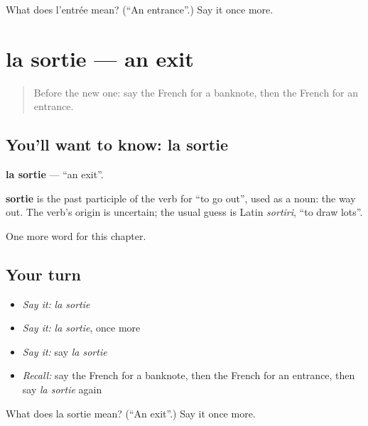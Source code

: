 \begin{tcolorbox}[breakable,colback=teal!4,colframe=teal!35!black,title={Before you move on}]
What does l'entrée mean? (\textquotedblleft{}An entrance\textquotedblright{}.) Say it once more.
\end{tcolorbox}
\section[la sortie]{la sortie — an exit}

\label{lesson:FR-C199-sortie}



\begin{quote}
Before the new one: say the French for a banknote, then the French for an entrance.
\end{quote}

\subsection*{You'll want to know: la sortie}
\textbf{la sortie} — \textquotedblleft{}an exit\textquotedblright{}.

\begin{cousinweb}
\textbf{sortie} is the past participle of the verb for \textquotedblleft{}to go out\textquotedblright{}, used as a noun: the way out. The verb's origin is uncertain; the usual guess is Latin \emph{sortiri}, \textquotedblleft{}to draw lots\textquotedblright{}.
\end{cousinweb}

\begin{grammarlens}[title={What you've built}]
One more word for this chapter.
\end{grammarlens}

\subsection*{Your turn}
\begin{itemize}
\raggedright
  \item \emph{Say it:} \emph{la sortie}
  \item \emph{Say it:} \emph{la sortie}, once more
  \item \emph{Say it:} say \emph{la sortie}
  \item \emph{Recall:} say the French for a banknote, then the French for an entrance, then say \emph{la sortie} again
\end{itemize}

\begin{tcolorbox}[breakable,colback=teal!4,colframe=teal!35!black,title={Before you move on}]
What does la sortie mean? (\textquotedblleft{}An exit\textquotedblright{}.) Say it once more.
\end{tcolorbox}
